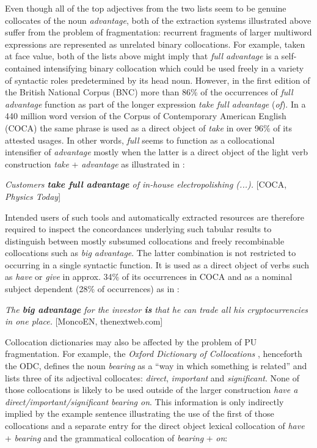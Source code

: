 \documentclass[output=paper]{langscibook}
\begin{document}
Even though all of the top adjectives from the two lists seem to be genuine collocates of the noun \textit{advantage}, both of the extraction systems illustrated above suffer from the problem of fragmentation: recurrent fragments of larger multiword expressions are represented as unrelated binary collocations. For example, taken at face value, both of the lists above might imply that \textit{full advantage} is a self-contained intensifying binary collocation which could be used freely in a variety of syntactic roles predetermined by its head noun. However, in the first edition of the British National Corpus (BNC) more than 86\% of the occurrences of \textit{full advantage} function as part of the longer expression \textit{take full advantage} (\textit{of}). In a 440 million word version of the Corpus of Contemporary American English (COCA) the same phrase is used as a direct object of \textit{take} in over 96\% of its attested usages. In other words, \textit{full} seems to function as a collocational intensifier of \textit{advantage} mostly when the latter is a direct object of the light verb construction \textit{take} + \textit{advantage} as illustrated in  :

\ea
\textit{Customers \textbf{\textit{take} \textbf{full} \textbf{advantage}} of in-house electropolishing (...).} [COCA, \textit{Physics Today}]\label{ex:pezik:2}
\z

Intended users of such tools and automatically extracted resources are therefore required to inspect the concordances underlying such tabular results to distinguish between mostly subsumed collocations and freely recombinable collocations such as \textit{big advantage}. The latter combination is not restricted to occurring in a single syntactic function. It is used as a direct object of verbs such as \textit{have} or \textit{give} in approx. 34\% of its occurrences in COCA and as a nominal subject dependent (28\% of occurrences) as in :

\ea
\textit{The \textbf{\textit{big} \textbf{advantage}} for the investor \textbf{\textit{is}} that he can trade all his cryptocurrencies in one place.} [MoncoEN, thenextweb.com]\label{ex:pezik:3}
\z

Collocation dictionaries may also be affected by the problem of PU fragmentation. For example, the \textit{Oxford Dictionary of Collocations} \citep{CrowtherEtAl2003}, henceforth the ODC, defines the noun \textit{bearing} as a ``way in which something is related'' and lists three of its adjectival collocates: \textit{direct}, \textit{important} and \textit{significant}. None of those collocations is likely to be used outside of the larger construction \textit{have a} \textit{direct\slash important\slash significant} \textit{bearing on}. This information is only indirectly implied by the example sentence illustrating the use of the first of those collocations and a separate entry for the direct object lexical collocation of \textit{have} + \textit{bearing} and the grammatical collocation of \textit{bearing} + \textit{on}:
\end{document}
